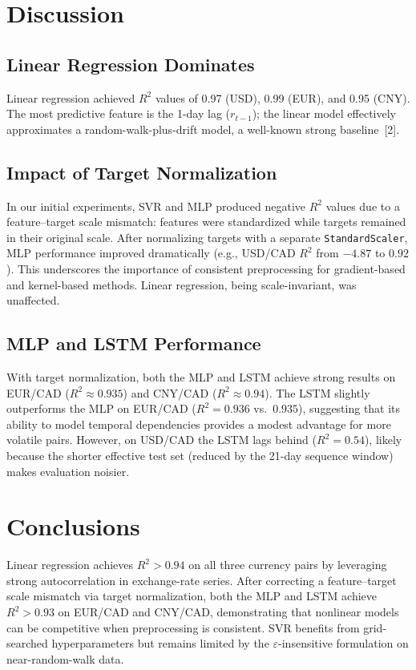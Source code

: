 \documentclass{article}
\begin{document}
\section{Discussion}

\subsection{Linear Regression Dominates}

Linear regression achieved $R^2$ values of 0.97 (USD), 0.99 (EUR), and 0.95 (CNY). The most predictive feature is the 1-day lag ($r_{t-1}$); the linear model effectively approximates a random-walk-plus-drift model, a well-known strong baseline~[2].

\subsection{Impact of Target Normalization}

In our initial experiments, SVR and MLP produced negative $R^2$ values due to a feature--target scale mismatch: features were standardized while targets remained in their original scale. After normalizing targets with a separate \texttt{StandardScaler}, MLP performance improved dramatically (e.g., USD/CAD $R^2$ from $-4.87$ to $0.92$). This underscores the importance of consistent preprocessing for gradient-based and kernel-based methods. Linear regression, being scale-invariant, was unaffected.

\subsection{MLP and LSTM Performance}

With target normalization, both the MLP and LSTM achieve strong results on EUR/CAD ($R^2 \approx 0.935$) and CNY/CAD ($R^2 \approx 0.94$). The LSTM slightly outperforms the MLP on EUR/CAD ($R^2 = 0.936$ vs.\ $0.935$), suggesting that its ability to model temporal dependencies provides a modest advantage for more volatile pairs. However, on USD/CAD the LSTM lags behind ($R^2 = 0.54$), likely because the shorter effective test set (reduced by the 21-day sequence window) makes evaluation noisier.

\section{Conclusions}

Linear regression achieves $R^2 > 0.94$ on all three currency pairs by leveraging strong autocorrelation in exchange-rate series. After correcting a feature--target scale mismatch via target normalization, both the MLP and LSTM achieve $R^2 > 0.93$ on EUR/CAD and CNY/CAD, demonstrating that nonlinear models can be competitive when preprocessing is consistent. SVR benefits from grid-searched hyperparameters but remains limited by the $\varepsilon$-insensitive formulation on near-random-walk data.
\end{document}

